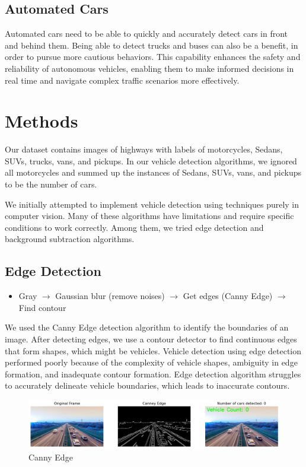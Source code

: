\documentclass{article}
\begin{document}
\subsection{Automated Cars}
Automated cars need to be able to quickly and accurately detect cars in front and behind them. Being able to detect trucks and buses can also be a benefit, in order to pursue more cautious behaviors. This capability enhances the safety and reliability of autonomous vehicles, enabling them to make informed decisions in real time and navigate complex traffic scenarios more effectively.

\section{Methods}
Our dataset contains images of highways with labels of motorcycles, Sedans, SUVs, trucks, vans, and pickups. In our vehicle detection algorithms, we ignored all motorcycles and summed up the instances of Sedans, SUVs, vans, and pickups to be the number of cars.

We initially attempted to implement vehicle detection using techniques purely in computer vision. Many of these algorithms have limitations and require specific conditions to work correctly. Among them, we tried edge detection and background subtraction algorithms.

\subsection{Edge Detection}
\begin{itemize}
    \item Gray $\rightarrow$ Gaussian blur (remove noises) $\rightarrow$ Get edges (Canny Edge) $\rightarrow$ Find contour
\end{itemize}
We used the Canny Edge detection algorithm to identify the boundaries of an image. After detecting edges, we use a contour detector to find continuous edges that form shapes, which might be vehicles. Vehicle detection using edge detection performed poorly because of the complexity of vehicle shapes, ambiguity in edge formation, and inadequate contour formation. Edge detection algorithm struggles to accurately delineate vehicle boundaries, which leads to inaccurate contours.

\begin{figure}[H]
    \centering
    \includegraphics[width=1\linewidth]{edge_detection.png}
    \caption{Canny Edge}
    \label{fig:enter-label}
\end{figure}
\end{document}

